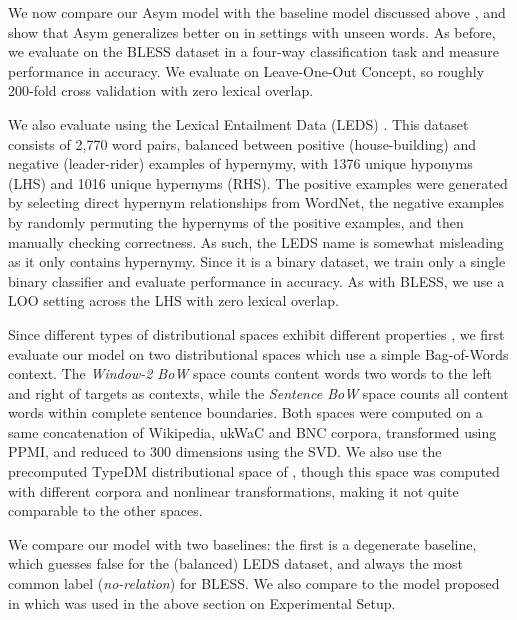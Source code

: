 We now compare our Asym model with the baseline model discussed above
\cite{baroni:2012:eacl}, and show that Asym generalizes better on in settings
with unseen words. As before, we evaluate on the BLESS dataset in a four-way
classification task and measure performance in accuracy. We evaluate on
Leave-One-Out Concept, so roughly 200-fold cross validation with zero lexical
overlap.

We also evaluate using the Lexical Entailment Data (LEDS)
\cite{baroni:2012:eacl}. This dataset consists of 2,770 word pairs, balanced
between positive (house-building) and negative (leader-rider) examples of
hypernymy, with 1376 unique hyponyms (LHS) and 1016 unique hypernyms (RHS). The
positive examples were generated by selecting direct hypernym relationships
from WordNet, the negative examples by randomly permuting the hypernyms of the
positive examples, and then manually checking correctness. As such, the LEDS
name is somewhat misleading as it only contains hypernymy. Since it is a binary
dataset, we train only a single binary classifier and evaluate performance in
accuracy. As with BLESS, we use a LOO setting across the LHS with zero lexical
overlap.

Since different types of distributional spaces exhibit different properties
\cite{peirsman:2008:essli,agirre:2009:naacl,baroni:2011:gems}, we first
evaluate our model on two distributional spaces which use a simple Bag-of-Words
context.  The {\em Window-2 BoW} space counts content words two words to the
left and right of targets as contexts, while the {\em Sentence BoW} space
counts all content words within complete sentence boundaries. Both spaces were
computed on a same concatenation of Wikipedia, ukWaC and BNC corpora,
transformed using PPMI, and reduced to 300 dimensions using the SVD. We also
use the precomputed TypeDM distributional space of ,
though this space was computed with different corpora and nonlinear
transformations, making it not quite comparable to the other spaces.

We compare our model with two baselines: the first is a degenerate baseline,
which guesses false for the (balanced) LEDS dataset, and always
the most common label ({\em no-relation}) for BLESS. We also compare to the
model proposed in  which was used in the above
section on Experimental Setup.


